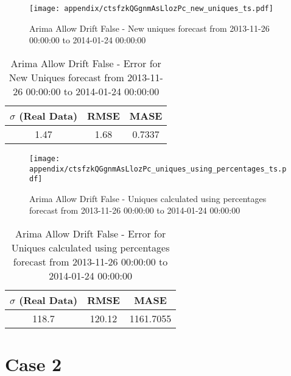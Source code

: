 \begin{figure}[H] \begin{center} \leavevmode
\texttt{[image: appendix/ctsfzkQGgnmAsLlozPc\_new\_uniques\_ts.pdf]} \caption{
Arima Allow Drift False - New uniques forecast from 2013-11-26 00:00:00 to 2014-01-24 00:00:00} \label{fig:appendix/ctsfzkQGgnmAsLlozPc_new_uniques_ts.pdf} \end{center}
\end{figure}

\begin{table}[H]
\centering
\footnotesize
\begin{tabular}{ccc}
$\sigma$ (Real Data) & RMSE & MASE   \\ \hline
1.47 & 1.68 & 0.7337 \\
\end{tabular}

\vspace{0.5cm}

\caption{
Arima Allow Drift False - Error for New Uniques forecast from 2013-11-26 00:00:00 to 2014-01-24 00:00:00}
\end{table}

\begin{figure}[H] \begin{center} \leavevmode
\texttt{[image: appendix/ctsfzkQGgnmAsLlozPc\_uniques\_using\_percentages\_ts.pdf]} \caption{
Arima Allow Drift False - Uniques calculated using percentages forecast from 2013-11-26 00:00:00 to 2014-01-24 00:00:00} \label{fig:appendix/ctsfzkQGgnmAsLlozPc_uniques_using_percentages_ts.pdf} \end{center}
\end{figure}

\begin{table}[H]
\centering
\footnotesize
\begin{tabular}{ccc}
$\sigma$ (Real Data) & RMSE & MASE   \\ \hline
118.7 & 120.12 & 1161.7055 \\
\end{tabular}

\vspace{0.5cm}

\caption{
Arima Allow Drift False - Error for Uniques calculated using percentages forecast from 2013-11-26 00:00:00 to 2014-01-24 00:00:00}
\end{table}

\chapter{Case 2}\label{ap:case2}

